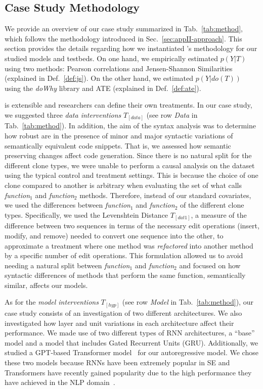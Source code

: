 \subsection{Case Study Methodology}
We provide an overview of our case study summarized in Tab.~\ref{tab:method}, which follows the \codegen methodology introduced in Sec.~\ref{sec:appII-approach}. This section provides the details regarding how we instantiated \codegen's methodology for our studied models and testbeds. On one hand, we empirically estimated $p(Y|T)$ using two methods: Pearson correlations and Jensen-Shannon Similarities (explained in Def.~\ref{def:js}). On the other hand, we estimated $p(Y|do(T))$ using the \textit{doWhy} library \citep{Sharma2021DoWhyAssumptions} and ATE (explained in Def.~\ref{def:ate}).

\codegen is extensible and researchers can define their own treatments. In our case study, we suggested three \textit{data interventions} $T_{[data]}$ (see row \textit{Data} in Tab.~\ref{tab:method}). In addition, the aim of the syntax analysis was to determine how robust \nlms are in the presence of minor and major syntactic variations of semantically equivalent code snippets. That is, we assessed how semantic preserving changes affect code generation. Since there is no natural split for the different clone types, we were unable to perform a causal analysis on the \BigCloneTB dataset using the typical control and treatment settings. This is because the choice of one clone compared to another is arbitrary when evaluating the set of what \BigCloneTB calls \textit{function$_1$} and \textit{function$_2$} methods. Therefore, instead of our standard covariates, we used the differences between \textit{function$_1$} and \textit{function$_2$} of the different clone types. Specifically, we used the Levenshtein Distance $T_{[dat1]}$, a measure of the difference between two sequences in terms of the necessary edit operations (insert, modify, and remove) needed to convert one sequence into the other, to approximate a treatment where one method was \textit{refactored} into another method by a specific number of edit operations. This formulation allowed us to avoid needing a natural split between \textit{function$_1$} and \textit{function$_2$} and focused on how syntactic differences of methods that perform the same function, \ie semantically similar, affects our models. 

As for the \textit{model interventions} $T_{[hyp]}$ (see row \textit{Model} in Tab.~\ref{tab:method}), our case study consists of an investigation of two different \nlm architectures. We also investigated how layer and unit variations in each architecture affect their performance. We made use of two different types of RNN architectures, a ``base'' model and a model that includes Gated Recurrent Units (GRU). Additionally, we studied a GPT-based Transformer model~\citep{Cho2014GRU, Radford2018ImprovingLU} for our autoregressive model. We chose these two models because RNNs have been extremely popular in SE \citep{watson2020dl4se} and Transformers have recently gained popularity due to the high performance they have achieved in the NLP domain~\citep{Mastropaolo2021StudyingTasks}.